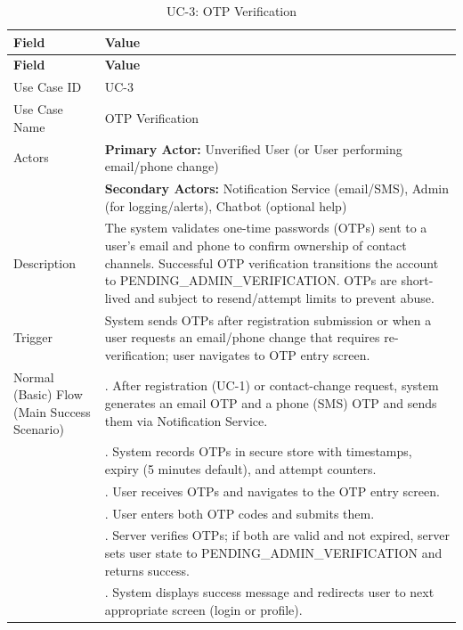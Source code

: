 \begin{longtable}{|>{\raggedright\arraybackslash}p{4cm}|>{\raggedright\arraybackslash}p{11cm}|}
\caption{UC-3: OTP Verification}
\label{tab:uc-3} \\
\hline
\rowcolor{lightgray!30}
\textbf{Field} & \textbf{Value} \\
\hline
\endfirsthead
\hline
\rowcolor{lightgray!30}
\textbf{Field} & \textbf{Value} \\
\hline
\endhead
\hline
\endfoot
\hline
\endlastfoot
Use Case ID & UC-3 \\
\hline
Use Case Name & OTP Verification \\
\hline
Actors & \textbf{Primary Actor:} Unverified User (or User performing email/phone change) \\
& \textbf{Secondary Actors:} Notification Service (email/SMS), Admin (for logging/alerts), Chatbot (optional help) \\
\hline
Description & The system validates one-time passwords (OTPs) sent to a user's email and phone to confirm ownership of contact channels. Successful OTP verification transitions the account to PENDING\_ADMIN\_VERIFICATION. OTPs are short-lived and subject to resend/attempt limits to prevent abuse. \\
\hline
Trigger & System sends OTPs after registration submission or when a user requests an email/phone change that requires re-verification; user navigates to OTP entry screen. \\
\hline
Normal (Basic) Flow (Main Success Scenario) & 1. After registration (UC-1) or contact-change request, system generates an email OTP and a phone (SMS) OTP and sends them via Notification Service. \\
& 2. System records OTPs in secure store with timestamps, expiry (5 minutes default), and attempt counters. \\
& 3. User receives OTPs and navigates to the OTP entry screen. \\
& 4. User enters both OTP codes and submits them. \\
& 5. Server verifies OTPs; if both are valid and not expired, server sets user state to PENDING\_ADMIN\_VERIFICATION and returns success. \\
& 6. System displays success message and redirects user to next appropriate screen (login or profile). \\

\end{longtable}
